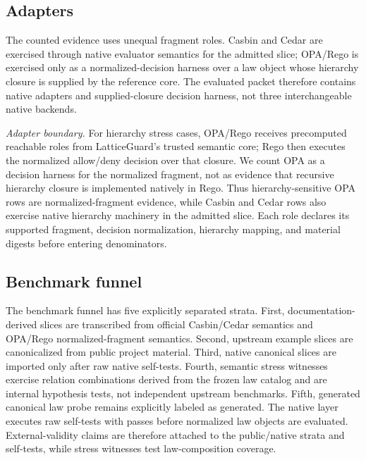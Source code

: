 \documentclass[10pt,conference]{IEEEtran}
\begin{document}
\subsection{Adapters}
The counted evidence uses unequal fragment roles.  Casbin and Cedar are exercised through native evaluator semantics for the admitted slice; OPA/Rego is exercised only as a normalized-decision harness over a law object whose hierarchy closure is supplied by the reference core.  The evaluated packet therefore contains \LGNativeAdapters{} native adapters and \LGDecisionHarnesses{} supplied-closure decision harness, not three interchangeable native backends.

\emph{Adapter boundary.}  For hierarchy stress cases, OPA/Rego receives precomputed reachable roles from LatticeGuard's trusted semantic core; Rego then executes the normalized allow/deny decision over that closure.  We count OPA as a decision harness for the normalized fragment, not as evidence that recursive hierarchy closure is implemented natively in Rego.  Thus hierarchy-sensitive OPA rows are normalized-fragment evidence, while Casbin and Cedar rows also exercise native hierarchy machinery in the admitted slice.  Each role declares its supported fragment, decision normalization, hierarchy mapping, and material digests before entering denominators.

\subsection{Benchmark funnel}
The benchmark funnel has five explicitly separated strata.  First, \LGOfficialDocSources{} documentation-derived slices are transcribed from official Casbin/Cedar semantics and OPA/Rego normalized-fragment semantics.  Second, \LGUpstreamExampleSources{} upstream example slices are canonicalized from public project material.  Third, \LGNativeCanonicalSources{} native canonical slices are imported only after raw native self-tests.  Fourth, \LGStressWitnessSources{} semantic stress witnesses exercise relation combinations derived from the frozen law catalog and are internal hypothesis tests, not independent upstream benchmarks.  Fifth, \LGGeneratedSources{} generated canonical law probe remains explicitly labeled as generated.  The native layer executes \LGNativeSelftests{} raw self-tests with \LGNativeSelftestPasses{} passes before normalized law objects are evaluated.  External-validity claims are therefore attached to the public/native strata and self-tests, while stress witnesses test law-composition coverage.
\end{document}
